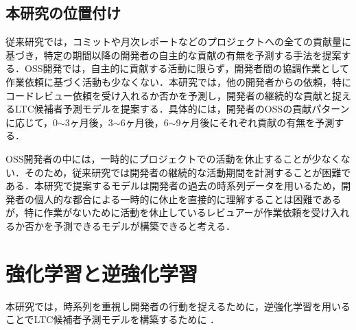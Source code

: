 \documentclass[submit,techrep,noauthor]{ipsj}
\begin{document}
\subsection{本研究の位置付け}
従来研究では，コミットや月次レポートなどのプロジェクトへの全ての貢献量に基づき，特定の期間以降の開発者の自主的な貢献の有無を予測する手法を提案する．OSS開発では，自主的に貢献する活動に限らず，開発者間の協調作業として作業依頼に基づく活動も少なくない．本研究では，他の開発者からの依頼，特にコードレビュー依頼を受け入れるか否かを予測し，開発者の継続的な貢献と捉えるLTC候補者予測モデルを提案する．具体的には，開発者のOSSの貢献パターンに応じて，0$\sim$3ヶ月後，3$\sim$6ヶ月後，6$\sim$9ヶ月後にそれぞれ貢献の有無を予測する．

OSS開発者の中には，一時的にプロジェクトでの活動を休止することが少なくない．そのため，従来研究では開発者の継続的な活動期間を計測することが困難である．本研究で提案するモデルは開発者の過去の時系列データを用いるため，開発者の個人的な都合による一時的に休止を直接的に理解することは困難であるが，特に作業がないために活動を休止しているレビュアーが作業依頼を受け入れるか否かを予測できるモデルが構築できると考える．



\section{強化学習と逆強化学習}\label{sec:ml}

本研究では，時系列を重視し開発者の行動を捉えるために，逆強化学習を用いることでLTC候補者予測モデルを構築するために
．
\end{document}
